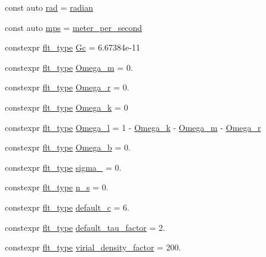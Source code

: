 \begin{DoxyCompactItemize}
\item 
const auto \hyperlink{namespaceIceBRG_a556de4acca26a5661d50a5b75880e95f}{rad} = \hyperlink{namespaceIceBRG_af78fec3f42ee23d596793328b8991468}{radian}
\item 
const auto \hyperlink{namespaceIceBRG_ad5f22cbf0896ee33ad84e89b40c7c065}{mps} = \hyperlink{namespaceIceBRG_a08cdd3f6d83518620b066a3e6c65701d}{meter\-\_\-per\-\_\-second}
\item 
constexpr \hyperlink{lib_2IceBRG__main_2common_8h_ad0f130a56eeb944d9ef2692ee881ecc4}{flt\-\_\-type} \hyperlink{namespaceIceBRG_ae34ca33d4c7073fde8efcc53cf6fd5f4}{Gc} = 6.\-67384e-\/11
\item 
constexpr \hyperlink{lib_2IceBRG__main_2common_8h_ad0f130a56eeb944d9ef2692ee881ecc4}{flt\-\_\-type} \hyperlink{namespaceIceBRG_acddabe6e9443c1f8cb4b3c1093342aa3}{Omega\-\_\-m} = 0.
\item 
constexpr \hyperlink{lib_2IceBRG__main_2common_8h_ad0f130a56eeb944d9ef2692ee881ecc4}{flt\-\_\-type} \hyperlink{namespaceIceBRG_a8861a491b3586ab09c51c1bfc9020698}{Omega\-\_\-r} = 0.
\item 
constexpr \hyperlink{lib_2IceBRG__main_2common_8h_ad0f130a56eeb944d9ef2692ee881ecc4}{flt\-\_\-type} \hyperlink{namespaceIceBRG_afb35c6ac056f6db5d60d8cb03a7b997a}{Omega\-\_\-k} = 0
\item 
constexpr \hyperlink{lib_2IceBRG__main_2common_8h_ad0f130a56eeb944d9ef2692ee881ecc4}{flt\-\_\-type} \hyperlink{namespaceIceBRG_adb990b0d239fa166345fc328d173dfec}{Omega\-\_\-l} = 1 -\/ \hyperlink{namespaceIceBRG_afb35c6ac056f6db5d60d8cb03a7b997a}{Omega\-\_\-k} -\/ \hyperlink{namespaceIceBRG_acddabe6e9443c1f8cb4b3c1093342aa3}{Omega\-\_\-m} -\/ \hyperlink{namespaceIceBRG_a8861a491b3586ab09c51c1bfc9020698}{Omega\-\_\-r}
\item 
constexpr \hyperlink{lib_2IceBRG__main_2common_8h_ad0f130a56eeb944d9ef2692ee881ecc4}{flt\-\_\-type} \hyperlink{namespaceIceBRG_a109232f7a7118dd2b89b92a18df26a79}{Omega\-\_\-b} = 0.
\item 
constexpr \hyperlink{lib_2IceBRG__main_2common_8h_ad0f130a56eeb944d9ef2692ee881ecc4}{flt\-\_\-type} \hyperlink{namespaceIceBRG_a110c5768e115f02bf29631b9f0bde3cc}{sigma\-\_} = 0.
\item 
constexpr \hyperlink{lib_2IceBRG__main_2common_8h_ad0f130a56eeb944d9ef2692ee881ecc4}{flt\-\_\-type} \hyperlink{namespaceIceBRG_a08eb14835ddd7739204fc116ccfff92d}{n\-\_\-s} = 0.
\item 
constexpr \hyperlink{lib_2IceBRG__main_2common_8h_ad0f130a56eeb944d9ef2692ee881ecc4}{flt\-\_\-type} \hyperlink{namespaceIceBRG_abcd07f4d78fce67e4c2d0a7929722725}{default\-\_\-c} = 6.
\item 
constexpr \hyperlink{lib_2IceBRG__main_2common_8h_ad0f130a56eeb944d9ef2692ee881ecc4}{flt\-\_\-type} \hyperlink{namespaceIceBRG_a0676bacdb07e422cde03208f56210270}{default\-\_\-tau\-\_\-factor} = 2.
\item 
constexpr \hyperlink{lib_2IceBRG__main_2common_8h_ad0f130a56eeb944d9ef2692ee881ecc4}{flt\-\_\-type} \hyperlink{namespaceIceBRG_aefc8a3f77d90888480c87cde4e641f9e}{virial\-\_\-density\-\_\-factor} = 200.
\end{DoxyCompactItemize}


